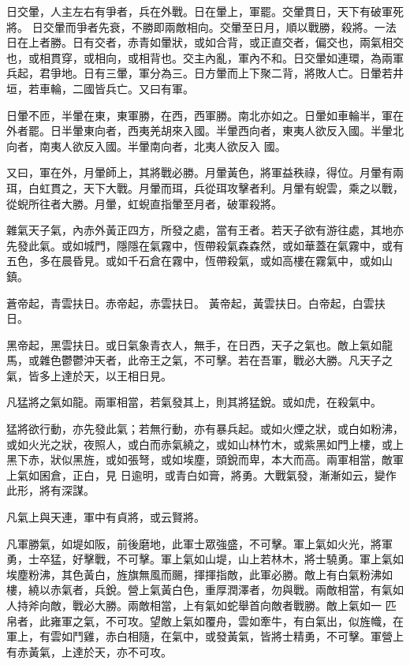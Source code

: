 \begin{pinyinscope}
 日交暈，人主左右有爭者，兵在外戰。日在暈上，軍罷。交暈貫日，天下有破軍死將。
 日交暈而爭者先衰，不勝即兩敵相向。交暈至日月，順以戰勝，殺將。一法日在上者勝。日有交者，赤青如暈狀，或如合背，或正直交者，偏交也，兩氣相交也，或相貫穿，或相向，或相背也。交主內亂，軍內不和。日交暈如連環，為兩軍兵起，君爭地。日有三暈，軍分為三。日方暈而上下聚二背，將敗人亡。日暈若井垣，若車輪，二國皆兵亡。又曰有軍。



 日暈不匝，半暈在東，東軍勝，在西，西軍勝。南北亦如之。日暈如車輪半，軍在外者罷。日半暈東向者，西夷羌胡來入國。半暈西向者，東夷人欲反入國。半暈北向者，南夷人欲反入國。半暈南向者，北夷人欲反入
 國。



 又曰，軍在外，月暈師上，其將戰必勝。月暈黃色，將軍益秩祿，得位。月暈有兩珥，白虹貫之，天下大戰。月暈而珥，兵從珥攻擊者利。月暈有蜺雲，乘之以戰，從蜺所往者大勝。月暈，虹蜺直指暈至月者，破軍殺將。



 雜氣天子氣，內赤外黃正四方，所發之處，當有王者。若天子欲有游往處，其地亦先發此氣。或如城門，隱隱在氣霧中，恆帶殺氣森森然，或如華蓋在氣霧中，或有五色，多在晨昏見。或如千石倉在霧中，恆帶殺氣，或如高樓在霧氣中，或如山鎮。



 蒼帝起，青雲扶日。赤帝起，赤雲扶日。
 黃帝起，黃雲扶日。白帝起，白雲扶日。



 黑帝起，黑雲扶日。或日氣象青衣人，無手，在日西，天子之氣也。敵上氣如龍馬，或雜色鬱鬱沖天者，此帝王之氣，不可擊。若在吾軍，戰必大勝。凡天子之氣，皆多上達於天，以王相日見。



 凡猛將之氣如龍。兩軍相當，若氣發其上，則其將猛銳。或如虎，在殺氣中。



 猛將欲行動，亦先發此氣；若無行動，亦有暴兵起。或如火煙之狀，或白如粉沸，或如火光之狀，夜照人，或白而赤氣繞之，或如山林竹木，或紫黑如門上樓，或上黑下赤，狀似黑旌，或如張弩，或如埃塵，頭銳而卑，本大而高。兩軍相當，敵軍上氣如囷倉，正白，見
 日逾明，或青白如膏，將勇。大戰氣發，漸漸如云，變作此形，將有深謀。



 凡氣上與天連，軍中有貞將，或云賢將。



 凡軍勝氣，如堤如阪，前後磨地，此軍士眾強盛，不可擊。軍上氣如火光，將軍勇，士卒猛，好擊戰，不可擊。軍上氣如山堤，山上若林木，將士驍勇。軍上氣如埃塵粉沸，其色黃白，旌旗無風而颺，揮揮指敵，此軍必勝。敵上有白氣粉沸如樓，繞以赤氣者，兵銳。營上氣黃白色，重厚潤澤者，勿與戰。兩敵相當，有氣如人持斧向敵，戰必大勝。兩敵相當，上有氣如蛇舉首向敵者戰勝。敵上氣如一
 匹帛者，此雍軍之氣，不可攻。望敵上氣如覆舟，雲如牽牛，有白氣出，似旌幟，在軍上，有雲如鬥雞，赤白相隨，在氣中，或發黃氣，皆將士精勇，不可擊。軍營上有赤黃氣，上達於天，亦不可攻。




\end{pinyinscope}
